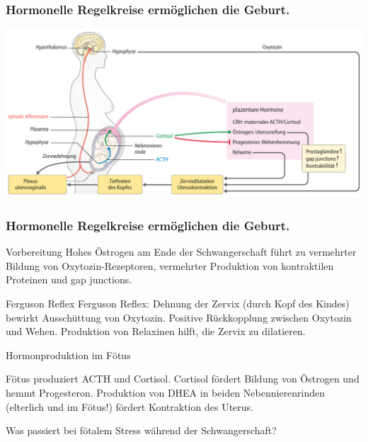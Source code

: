 \documentclass{beamer}
\begin{document}
\begin{frame}
\frametitle{Hormonelle Regelkreise ermöglichen die Geburt. }

\begin{center}
\includegraphics[width=\textwidth]{geburt_hormone}
\end{center}


\end{frame}

\begin{frame}
\frametitle{Hormonelle Regelkreise ermöglichen die Geburt. }

\begin{block}{Vorbereitung}
Hohes Östrogen am Ende der Schwangerschaft  führt zu vermehrter Bildung von Oxytozin-Rezeptoren, vermehrter Produktion von  
kontraktilen Proteinen und gap junctions. 
\end{block}

\pause
\begin{block}{Ferguson Reflex}
Ferguson Reflex: Dehnung der Zervix (durch Kopf des Kindes) bewirkt Ausschüttung von Oxytozin. Positive Rückkopplung zwischen Oxytozin und Wehen. Produktion von Relaxinen hilft, die Zervix zu dilatieren. 
\end{block}

\pause

\begin{block}{Hormonproduktion im Fötus}

Fötus produziert ACTH und Cortisol. Cortisol fördert Bildung von Östrogen und hemmt Progesteron. Produktion von  DHEA in beiden Nebennierenrinden (elterlich und im Fötus!) fördert Kontraktion des Uterus. 

 

\pause

\textcolor{theme}{Was passiert bei fötalem Stress während der Schwangerschaft? }

\end{block}

\end{frame}
\end{document}
